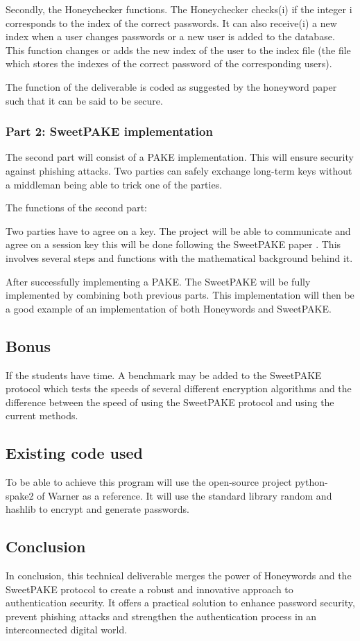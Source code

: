 \documentclass[conference,compsoc]{IEEEtran}
\begin{document}
Secondly, the Honeychecker functions. The Honeychecker checks(i) if the integer
i corresponds to the index of the correct passwords. It can also receive(i) a
new index when a user changes passwords or a new user is added to the database.
This function changes or adds the new index of the user to the index file (the
file which stores the indexes of the correct password of the corresponding
users).

The function of the deliverable is coded as suggested by the honeyword paper
such that it can be said to be secure.

\subsubsection{Part 2: SweetPAKE implementation} The second part will consist
of a PAKE implementation. This will ensure security against phishing attacks.
Two parties can safely exchange long-term keys without a middleman being able
to trick one of the parties.

The functions of the second part:

Two parties have to agree on a key. The project will be able to communicate and
agree on a session key this will be done following the SweetPAKE paper
\cite{sweetpake}. This involves several steps and functions with the
mathematical background behind it.

After successfully implementing a PAKE. The SweetPAKE will be fully implemented
by combining both previous parts. This implementation will then be a good
example of an implementation of both Honeywords and SweetPAKE.

\subsection{Bonus} If the students have time. A benchmark may be added to the
SweetPAKE protocol which tests the speeds of several different encryption
algorithms and the difference between the speed of using the SweetPAKE protocol
and using the current methods.

\subsection{Existing code used} To be able to achieve this program will use the
open-source project python-spake2 of Warner as a reference. It will use the
standard library random and hashlib to encrypt and generate passwords.

\subsection{Conclusion} In conclusion, this technical deliverable merges the
power of Honeywords and the SweetPAKE protocol to create a robust and
innovative approach to authentication security. It offers a practical solution
to enhance password security, prevent phishing attacks and strengthen the
authentication process in an interconnected digital world.

\printbibliography

\clearpage
\end{document}
